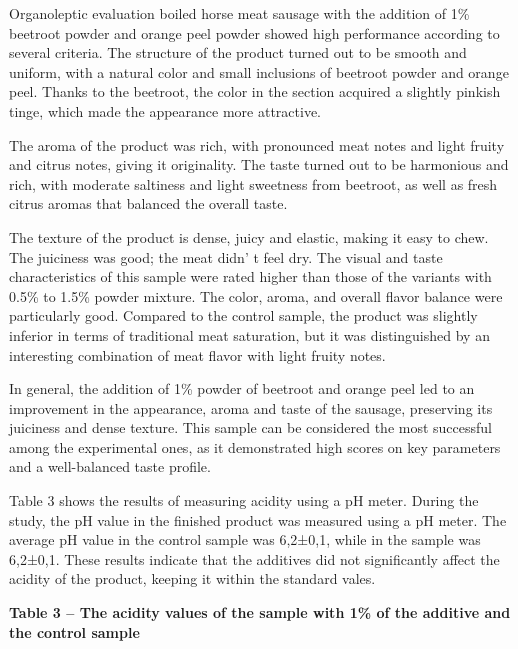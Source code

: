 \begin{multicols}{2}
Organoleptic evaluation boiled horse meat sausage with the addition of
1\% beetroot powder and orange peel powder showed high performance
according to several criteria. The structure of the product turned out
to be smooth and uniform, with a natural color and small inclusions of
beetroot powder and orange peel. Thanks to the beetroot, the color in
the section acquired a slightly pinkish tinge, which made the appearance
more attractive.

The aroma of the product was rich, with pronounced meat notes and light
fruity and citrus notes, giving it originality. The taste turned out to
be harmonious and rich, with moderate saltiness and light sweetness from
beetroot, as well as fresh citrus aromas that balanced the overall
taste.

The texture of the product is dense, juicy and elastic, making it easy
to chew. The juiciness was good; the meat didn' t feel
dry. The visual and taste characteristics of this sample were rated
higher than those of the variants with 0.5\% to 1.5\% powder mixture.
The color, aroma, and overall flavor balance were particularly good.
Compared to the control sample, the product was slightly inferior in
terms of traditional meat saturation, but it was distinguished by an
interesting combination of meat flavor with light fruity notes.

In general, the addition of 1\% powder of beetroot and orange peel led
to an improvement in the appearance, aroma and taste of the sausage,
preserving its juiciness and dense texture. This sample can be
considered the most successful among the experimental ones, as it
demonstrated high scores on key parameters and a well-balanced taste
profile.

Table 3 shows the results of measuring acidity using a pH meter. During
the study, the pH value in the finished product was measured using a pH
meter. The average pH value in the control sample was 6,2±0,1, while in
the sample was 6,2±0,1. These results indicate that the additives did
not significantly affect the acidity of the product, keeping it within
the standard vales.
\end{multicols}

{\bfseries Table 3 -- The acidity values of the sample with 1\% of the additive and the control sample}

